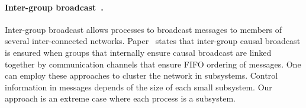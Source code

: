 

\paragraph{Inter-group
  broadcast~\cite{johnson1998scalable,johnson1999intergroup}.} Inter-group
broadcast allows processes to broadcast messages to members of several
inter-connected networks. Paper~\cite{johnson1999intergroup} states that
inter-group causal broadcast is ensured when groups that internally ensure
causal broadcast are linked together by communication channels that ensure FIFO
ordering of messages. One can employ these approaches to cluster the network in
subsystems. Control information in messages depends of the size of each small
subsystem. Our approach is an extreme case where each process is a
subsystem.




